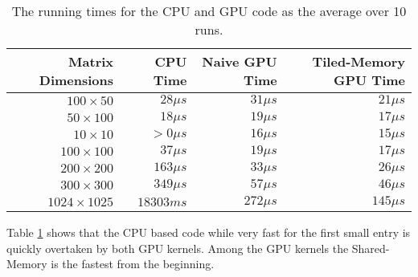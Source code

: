 \begin{table}
    \begin{tabular}{|r|r|r|r|}
        \hline
        \textbf{Matrix Dimensions} & \textbf{CPU Time} & \textbf{Naive GPU Time} & \textbf{Tiled-Memory GPU Time}\\\hline
        $100 \times  50$  & $28 \mu s$  & $31 \mu s$ & $21 \mu s$ \\
        $50 \times  100$  & $18 \mu s$  & $19 \mu s$ & $17 \mu s$ \\
        $10 \times  10$   & $>0 \mu s$  & $16 \mu s$ & $15 \mu s$ \\
        $100 \times  100$ & $37 \mu s$  & $19 \mu s$ & $17 \mu s$ \\
        $200 \times  200$ & $163 \mu s$ & $33 \mu s$ & $26 \mu s$ \\
        $300 \times  300$ & $349 \mu s$ & $57 \mu s$ & $46 \mu s$ \\
        $1024\times 1025$ & $18303 ms$  & $272\mu s$ & $145\mu s$ \\\hline

    \end{tabular}
    \caption{The running times for the CPU and GPU code as the average over 10
    runs.}
    \label{tab:task1time}
\end{table}

Table \ref{tab:task1time} shows that the CPU based code while very fast for the
first small entry is quickly overtaken by both GPU kernels. Among the GPU
kernels the Shared-Memory is the fastest from the beginning.
